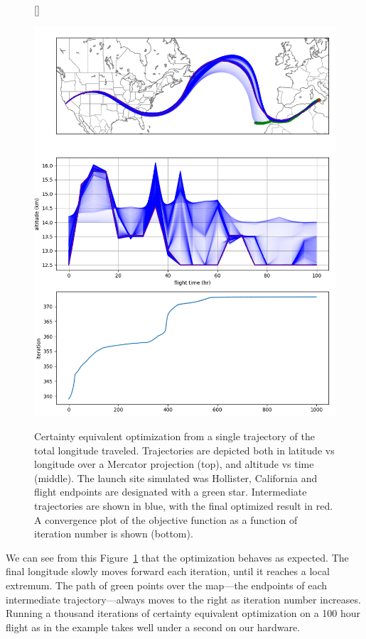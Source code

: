 \documentclass[11pt]{scrartcl} %
\begin{document}
\begin{figure}[h!]
[\FBwidth]
{\caption{Certainty equivalent optimization from a single trajectory of the total longitude traveled. Trajectories are depicted both in latitude vs longitude over a Mercator projection (top), and altitude vs time (middle). The launch site simulated was Hollister, California and flight endpoints are designated with a green star. Intermediate trajectories are shown in blue, with the final optimized result in red. A convergence plot of the objective function as a function of iteration number is shown (bottom).}\label{ce}}
{\includegraphics[width=1\linewidth]{certaintyeq.png}}
\end{figure}

We can see from this Figure~\ref{ce} that the optimization behaves as expected. The final longitude slowly moves forward each iteration, until it reaches a local extremum. The path of green points over the map---the endpoints of each intermediate trajectory---always moves to the right as iteration number increases. Running a thousand iterations of certainty equivalent optimization on a 100 hour flight as in the example takes well under a second on our hardware.
\end{document}
